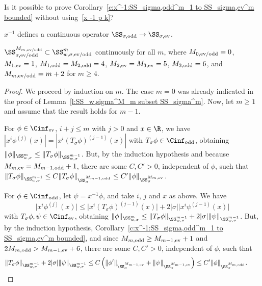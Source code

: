 \begin{quest}
  Is it possible to prove Corollary~\ref{c:x^-1:SS_sigma,odd^m_1 to SS_sigma,ev^m bounded} without using~\eqref{x -1 p k}?
\end{quest}


\begin{Corollary}\label{c:x^-1 continuous}
  $x^{-1}$ defines a continuous operator $\SS_{\sigma,\text{\rm odd}}\to\SS_{\sigma,\text{\rm ev}}$.
\end{Corollary}

\begin{Lemma}\label{l:SS_sigma^m+2 subset SS_w,sigma^m}
  $\SS_{\sigma,\text{\rm ev/odd}}^{M_{m,\text{\rm ev/odd}}}\subset\SS_{w,\sigma,\text{\rm ev/odd}}^m$ continuously for all $m$, where $M_{0,\text{\rm ev/odd}}=0$, $M_{1,\text{\rm ev}}=1$, $M_{1,\text{\rm odd}}=M_{2,\text{\rm odd}}=4$, $M_{2,\text{\rm ev}}=M_{3,\text{\rm ev}}=5$, $M_{3,\text{\rm odd}}=6$, and $M_{m,\text{\rm ev/odd}}=m+2$ for $m\ge4$.
\end{Lemma}

\begin{proof}
  We proceed by induction on $m$. The case $m=0$ was already indicated in the proof of Lemma~\ref{l:SS_w,sigma^M_m subset SS_sigma^m}. Now, let $m\ge1$ and assume that the result holds for $m-1$.

  For $\phi\in \Cinf_{\text{\rm ev}}$, $i+j\le m$ with $j>0$ and $x\in\R$, we have $|x^i\phi^{(j)}(x)|=|x^i(T_\sigma\phi)^{(j-1)}(x)|$ with $T_\sigma\phi\in \Cinf_{\text{\rm odd}}$, obtaining $\|\phi\|_{\SS_{w,\sigma}^m}\le\|T_\sigma\phi\|_{\SS_{w,\sigma}^{m-1}}$. But, by the induction hypothesis and because $M_{m,\text{\rm ev}}=M_{m-1,\text{\rm odd}}+1$, there are some $C,C'>0$, independent of $\phi$, such that $\|T_\sigma\phi\|_{\SS_{w,\sigma}^{m-1}}\le C \|T_\sigma\phi\|_{\SS_\sigma^{M_{m-1,\text{\rm odd}}}}\le C' \|\phi\|_{\SS_\sigma^{M_{m,\text{\rm ev}}}}$.

  For $\phi\in \Cinf_{\text{\rm odd}}$, let $\psi=x^{-1}\phi$, and take $i$, $j$ and $x$ as above. We have
    \[
      \big|x^i\phi^{(j)}(x)\big|\le\big|x^i(T_\sigma\phi)^{(j-1)}(x)\big|
      +2 |\sigma|\big|x^i\psi^{(j-1)}(x)\big|
    \]
  with $T_\sigma\phi,\psi\in\Cinf_{\text{\rm ev}}$, obtaining $ \|\phi\|_{\SS_{w,\sigma}^m}\le\|T_\sigma\phi\|_{\SS_{w,\sigma}^{m-1}}
      +2 |\sigma| \|\psi\|_{\SS_{w,\sigma}^{m-1}}$. But, by the induction hypothesis, Corollary~\ref{c:x^-1:SS_sigma,odd^m_1 to SS_sigma,ev^m bounded}, and since $M_{m,\text{\rm odd}}\ge M_{m-1,\text{\rm ev}}+1$ and $2M_{m,\text{\rm odd}}>M_{m-1,\text{\rm ev}}+6$, there are some $C,C'>0$, independent of $\phi$, such that
    \begin{gather*}
      \|T_\sigma\phi\|_{\SS_{w,\sigma}^{m-1}}+2 |\sigma| \|\psi\|_{\SS_{w,\sigma}^{m-1}}
      \le C\left(\|\phi'\|_{\SS_\sigma^{M_{m-1,\text{\rm ev}}}}+\|\psi\|_{\SS_\sigma^{M_{m-1,\text{\rm ev}}}}\right)
      \le C' \|\phi\|_{\SS_\sigma^{M_{m,\text{\rm odd}}}} .\tag*{\qed}
    \end{gather*}
\renewcommand{\qed}{}
\end{proof}

